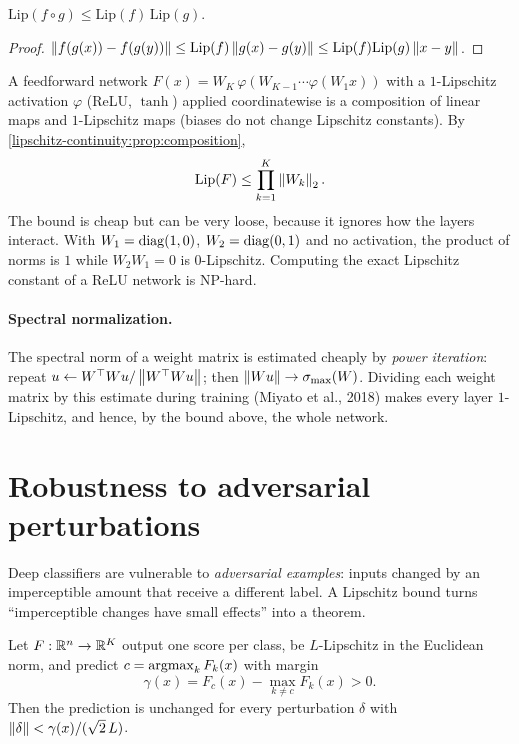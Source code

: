 \begin{notechapter}
\begin{proposition}[Composition]\label{lipschitz-continuity:prop:composition}
$\mathrm{Lip}(f\circ g)\leq\mathrm{Lip}(f)\,\mathrm{Lip}(g)$.
\end{proposition}

\begin{proof}
$\left\|f(g(x)) - f(g(y))\right\|\leq\mathrm{Lip}(f)\left\|g(x) - g(y)\right\|\leq\mathrm{Lip}(f)\mathrm{Lip}(g)\left\|x-y\right\|$.
\end{proof}

\begin{example}\label{lipschitz-continuity:ex:network}
A feedforward network
$F(x) = W_K\,\varphi(W_{K-1}\cdots\varphi(W_1x))$ with a $1$-Lipschitz activation
$\varphi$ (ReLU, $\tanh$) applied coordinatewise is a composition of linear maps
and $1$-Lipschitz maps (biases do not change Lipschitz constants). By
\cref{lipschitz-continuity:prop:composition},
\[
  \mathrm{Lip}(F)\leq\prod_{k=1}^K\left\|W_k\right\|_2 .
\]
The bound is cheap but can be very loose, because it ignores how the layers
interact. With $W_1 = \operatorname{diag}(1,0)$, $W_2 = \operatorname{diag}(0,1)$ and no activation, the
product of norms is $1$ while $W_2W_1 = 0$ is $0$-Lipschitz. Computing the exact
Lipschitz constant of a ReLU network is NP-hard.
\end{example}

\paragraph{Spectral normalization.} The spectral norm of a weight matrix is
estimated cheaply by \emph{power iteration}: repeat
$u\leftarrow W^\top Wu/\left\|W^\top Wu\right\|$; then $\left\|Wu\right\|\to\sigma_{\max}(W)$.
Dividing each weight matrix by this estimate during training (Miyato et al.,
2018) makes every layer $1$-Lipschitz, and hence, by the bound above, the whole
network.

\section{Robustness to adversarial perturbations}\label{lipschitz-continuity:sec:robustness}

Deep classifiers are vulnerable to \emph{adversarial examples}: inputs changed
by an imperceptible amount that receive a different label. A Lipschitz bound
turns ``imperceptible changes have small effects'' into a theorem.

\begin{proposition}\label{lipschitz-continuity:prop:certified}
Let $F:\mathbb{R}^n\to\mathbb{R}^K$ output one score per class, be $L$-Lipschitz in the
Euclidean norm, and predict $c = \operatorname*{argmax}_k F_k(x)$ with margin
\[
  \gamma(x) = F_c(x) - \max_{k\neq c}F_k(x) > 0 .
\]
Then the prediction is unchanged for every perturbation $\delta$ with
$\left\|\delta\right\| < \gamma(x)/(\sqrt2\,L)$.
\end{proposition}


\end{notechapter}
